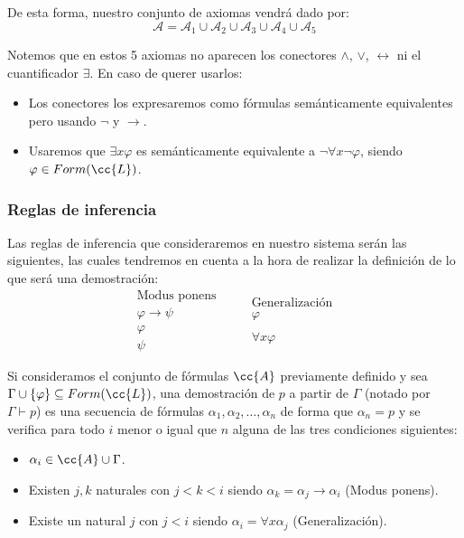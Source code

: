 De esta forma, nuestro conjunto de axiomas vendrá dado por:
\begin{equation*}
    \mathcal{A} = \mathcal{A}_1 \cup \mathcal{A}_2 \cup \mathcal{A}_3 \cup \mathcal{A}_4 \cup \mathcal{A}_5
\end{equation*}

Notemos que en estos 5 axiomas no aparecen los conectores $\land$, $\lor$, $\leftrightarrow $ ni el cuantificador $\exists $. En caso de querer usarlos:
\begin{itemize}
    \item Los conectores los expresaremos como fórmulas semánticamente equivalentes pero usando $\lnot$ y $\to$.
    \item Usaremos que $\exists x\varphi$ es semánticamente equivalente a $\lnot\forall x\lnot\varphi$, siendo $\varphi \in Form(\cc{L})$.
\end{itemize}

\subsubsection{Reglas de inferencia}
Las reglas de inferencia que consideraremos en nuestro sistema serán las siguientes, las cuales tendremos en cuenta a la hora de realizar la definición de lo que será una demostración:
\begin{equation*}
    \begin{array}{l}
        \text{Modus ponens} \\
        \varphi\to \psi \\
        \varphi \\
        \hline
        \psi 
    \end{array} \qquad \begin{array}{l}
        \text{Generalización}\\
        \varphi \\
        \ \\
        \hline
        \forall x\varphi 
    \end{array}
\end{equation*}

\begin{definicion}[Demostración]
    Si consideramos el conjunto de fórmulas $\cc{A}$ previamente definido y sea $\Gamma\cup\{\varphi\} \subseteq Form(\cc{L})$, una demostración de $p$ a partir de $\Gamma$ (notado por $\Gamma\vdash p$) es una secuencia de fórmulas $\alpha_1,\alpha_2,\ldots,\alpha_n$ de forma que $\alpha_n = p$ y se verifica para todo $i$ menor o igual que $n$ alguna de las tres condiciones siguientes:
    \begin{itemize}
        \item $\alpha_i \in \cc{A}\cup \Gamma$.
        \item Existen $j,k$ naturales con $j<k<i$ siendo $\alpha_k = \alpha_j \to \alpha_i$ (Modus ponens).
        \item Existe un natural $j$ con $j<i$ siendo $\alpha_i = \forall x\alpha_j$ (Generalización).
    \end{itemize}
\end{definicion}

